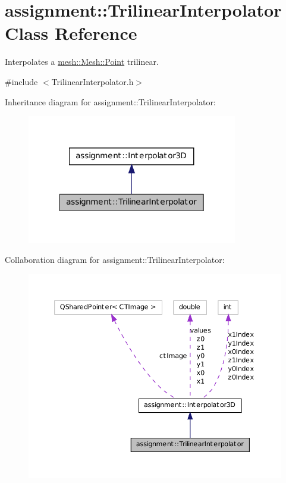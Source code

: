 \hypertarget{classassignment_1_1_trilinear_interpolator}{
\section{assignment::TrilinearInterpolator Class Reference}
\label{classassignment_1_1_trilinear_interpolator}
}


Interpolates a \hyperlink{structmesh_1_1_mesh_1_1_point}{mesh::Mesh::Point} trilinear.  




{\ttfamily \#include $<$TrilinearInterpolator.h$>$}



Inheritance diagram for assignment::TrilinearInterpolator:\nopagebreak
\begin{figure}[H]
\begin{center}
\leavevmode
\includegraphics[width=260pt]{classassignment_1_1_trilinear_interpolator__inherit__graph}
\end{center}
\end{figure}


Collaboration diagram for assignment::TrilinearInterpolator:\nopagebreak
\begin{figure}[H]
\begin{center}
\leavevmode
\includegraphics[width=385pt]{classassignment_1_1_trilinear_interpolator__coll__graph}
\end{center}
\end{figure}
